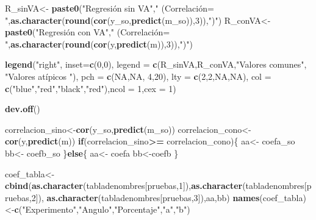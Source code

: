 \documentclass[]{article}
\newenvironment{Shaded}{\begin{snugshade}}{\end{snugshade}}
\newcommand{\KeywordTok}[1]{\textcolor[rgb]{0.13,0.29,0.53}{\textbf{#1}}}
\newcommand{\DataTypeTok}[1]{\textcolor[rgb]{0.13,0.29,0.53}{#1}}
\newcommand{\DecValTok}[1]{\textcolor[rgb]{0.00,0.00,0.81}{#1}}
\newcommand{\StringTok}[1]{\textcolor[rgb]{0.31,0.60,0.02}{#1}}
\newcommand{\OtherTok}[1]{\textcolor[rgb]{0.56,0.35,0.01}{#1}}
\newcommand{\ControlFlowTok}[1]{\textcolor[rgb]{0.13,0.29,0.53}{\textbf{#1}}}
\newcommand{\OperatorTok}[1]{\textcolor[rgb]{0.81,0.36,0.00}{\textbf{#1}}}
\newcommand{\NormalTok}[1]{#1}
\begin{document}
\begin{Shaded}
\begin{Highlighting}[]
{{{\NormalTok{    R_sinVA<-}\StringTok{ }\KeywordTok{paste0}\NormalTok{(}\StringTok{"Regresión sin VA"}\NormalTok{,}\StringTok{" (Correlación= "}\NormalTok{,}\KeywordTok{as.character}\NormalTok{(}\KeywordTok{round}\NormalTok{(}\KeywordTok{cor}\NormalTok{(y_so,}\KeywordTok{predict}\NormalTok{(m_so)),}\DecValTok{3}\NormalTok{)),}\StringTok{")"}\NormalTok{)}
\NormalTok{    R_conVA<-}\StringTok{ }\KeywordTok{paste0}\NormalTok{(}\StringTok{"Regresión con VA"}\NormalTok{,}\StringTok{" (Correlación= "}\NormalTok{,}\KeywordTok{as.character}\NormalTok{(}\KeywordTok{round}\NormalTok{(}\KeywordTok{cor}\NormalTok{(y,}\KeywordTok{predict}\NormalTok{(m)),}\DecValTok{3}\NormalTok{)),}\StringTok{")"}\NormalTok{)}
    
    
    \KeywordTok{legend}\NormalTok{(}\StringTok{"right"}\NormalTok{, }\DataTypeTok{inset=}\KeywordTok{c}\NormalTok{(}\DecValTok{0}\NormalTok{,}\DecValTok{0}\NormalTok{),}
           \DataTypeTok{legend =} \KeywordTok{c}\NormalTok{(R_sinVA,R_conVA,}\StringTok{"Valores comunes"}\NormalTok{, }\StringTok{"Valores atípicos "}\NormalTok{),}
           \DataTypeTok{pch =} \KeywordTok{c}\NormalTok{(}\OtherTok{NA}\NormalTok{,}\OtherTok{NA}\NormalTok{, }\DecValTok{4}\NormalTok{,}\DecValTok{20}\NormalTok{),}
           \DataTypeTok{lty =} \KeywordTok{c}\NormalTok{(}\DecValTok{2}\NormalTok{,}\DecValTok{2}\NormalTok{,}\OtherTok{NA}\NormalTok{,}\OtherTok{NA}\NormalTok{), }
           \DataTypeTok{col =} \KeywordTok{c}\NormalTok{(}\StringTok{"blue"}\NormalTok{,}\StringTok{"red"}\NormalTok{,}\StringTok{"black"}\NormalTok{,}\StringTok{"red"}\NormalTok{),}\DataTypeTok{ncol =} \DecValTok{1}\NormalTok{,}\DataTypeTok{cex =} \DecValTok{1}\NormalTok{)}
    
    \KeywordTok{dev.off}\NormalTok{()}
    
\NormalTok{    correlacion_sino<-}\KeywordTok{cor}\NormalTok{(y_so,}\KeywordTok{predict}\NormalTok{(m_so))}
\NormalTok{    correlacion_cono<-}\KeywordTok{cor}\NormalTok{(y,}\KeywordTok{predict}\NormalTok{(m))}
    \ControlFlowTok{if}\NormalTok{(correlacion_sino}\OperatorTok{>=}\StringTok{ }\NormalTok{correlacion_cono)\{}
\NormalTok{      aa<-}\StringTok{ }\NormalTok{coefa_so}
\NormalTok{      bb<-}\StringTok{ }\NormalTok{coefb_so}
\NormalTok{    \}}\ControlFlowTok{else}\NormalTok{\{}
\NormalTok{      aa<-}\StringTok{ }\NormalTok{coefa}
\NormalTok{      bb<-coefb}
\NormalTok{    \}}
    
\NormalTok{    coef_tabla<-}\StringTok{ }\KeywordTok{cbind}\NormalTok{(}\KeywordTok{as.character}\NormalTok{(tabladenombres[pruebas,}\DecValTok{1}\NormalTok{]),}\KeywordTok{as.character}\NormalTok{(tabladenombres[pruebas,}\DecValTok{2}\NormalTok{]),}
                       \KeywordTok{as.character}\NormalTok{(tabladenombres[pruebas,}\DecValTok{3}\NormalTok{]),aa,bb)  }
    \KeywordTok{names}\NormalTok{(coef_tabla)<-}\KeywordTok{c}\NormalTok{(}\StringTok{"Experimento"}\NormalTok{,}\StringTok{"Angulo"}\NormalTok{,}\StringTok{"Porcentaje"}\NormalTok{,}\StringTok{"a"}\NormalTok{,}\StringTok{"b"}\NormalTok{)}
    
}}}
\end{Highlighting}
\end{Shaded}
\end{document}

